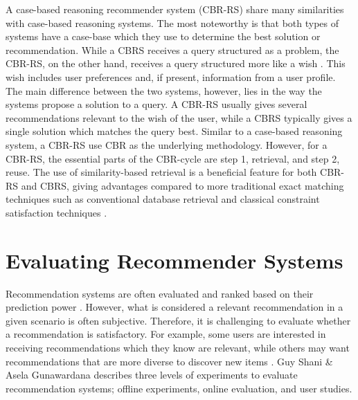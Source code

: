 A case-based reasoning recommender system (CBR-RS) share many similarities with case-based reasoning systems. The most noteworthy is that both types of systems have a case-base which they use to determine the best solution or recommendation. While a CBRS receives a query structured as a problem, the CBR-RS, on the other hand, receives a query structured more like a wish \cite{richter2013case}. This wish includes user preferences and, if present, information from a user profile. The main difference between the two systems, however, lies in the way the systems propose a solution to a query. A CBR-RS usually gives several recommendations relevant to the wish of the user, while a CBRS typically gives a single solution which matches the query best. Similar to a case-based reasoning system, a CBR-RS use CBR as the underlying methodology. However, for a CBR-RS, the essential parts of the CBR-cycle are step 1, retrieval, and step 2, reuse. The use of similarity-based retrieval is a beneficial feature for both CBR-RS and CBRS, giving advantages compared to more traditional exact matching techniques such as conventional database retrieval and classical constraint satisfaction techniques \cite{bridge2005case}.

\section{Evaluating Recommender Systems}

Recommendation systems are often evaluated and ranked based on their prediction power \cite{shani2011evaluating}. However, what is considered a relevant recommendation in a given scenario is often subjective. Therefore, it is challenging to evaluate whether a recommendation is satisfactory. For example, some users are interested in receiving recommendations which they know are relevant, while others may want recommendations that are more diverse to discover new items \cite{shani2011evaluating}. Guy Shani \& Asela Gunawardana \cite{shani2011evaluating} describes three levels of experiments to evaluate recommendation systems; offline experiments, online evaluation, and user studies.

